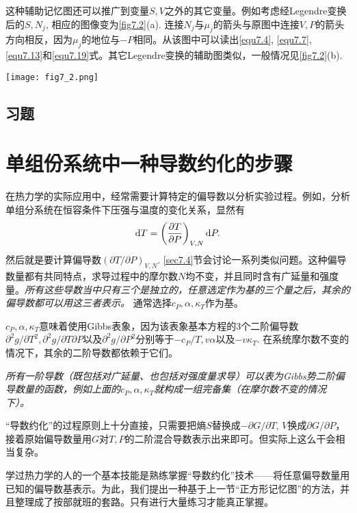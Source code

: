 这种辅助记忆图还可以推广到变量$S, V$之外的其它变量。例如考虑经Legendre变换后的$S, N_j$, 相应的图像变为\ref{fig7.2}(a). 连接$N_j$与$\mu_j$的箭头与原图中连接$V, P$的箭头方向相反，因为$\mu_j$的地位与$-P$相同。从该图中可以读出\eqref{equ7.4}, \eqref{equ7.7}, \eqref{equ7.13}和\eqref{equ7.19}式。其它Legendre变换的辅助图类似，一般情况见\ref{fig7.2}(b).

{
	\centering
	\texttt{[image: fig7\_2.png]}
	\figcaption{}
	\label{fig7.2}
}

\subsection*{习题}


\section{单组份系统中一种导数约化的步骤}
\label{sec7.3}
在热力学的实际应用中，经常需要计算特定的偏导数以分析实验过程。例如，分析单组分系统在恒容条件下压强与温度的变化关系，显然有
\begin{equation}
	\mathrm{d} T = \left( \frac{\partial T}{\partial P} \right)_{V, N} \mathrm{d} P.
\label{equ7.32}
\end{equation}
然后就是要计算偏导数$(\partial T / \partial P)_{V, N}$. \ref{sec7.4}节会讨论一系列类似问题。这种偏导数量都有共同特点，求导过程中的摩尔数$N$均不变，并且同时含有广延量和强度量。{\it 所有这些导数当中只有三个是独立的，任意选定作为基的三个量之后，其余的偏导数都可以用这三者表示。} 通常选择$c_P, \alpha, \kappa_T$作为基。

$c_P, \alpha, \kappa_T$意味着使用Gibbs表象，因为该表象基本方程的3个二阶偏导数$\partial^2 g / \partial T^2, \partial^2 g / \partial T \partial P$以及$\partial^2 g / \partial P^2$分别等于$-c_P / T, v\alpha$以及$-v \kappa_T$. 在系统摩尔数不变的情况下，其余的二阶导数都依赖于它们。

{\it 所有一阶导数（既包括对广延量、也包括对强度量求导）可以表为Gibbs势二阶偏导数量的函数，例如上面的$c_P, \alpha, \kappa_T$就构成一组完备集（在摩尔数不变的情况下）。}

“导数约化”的过程原则上十分直接，只需要把熵$S$替换成$-\partial G / \partial T$, $V$换成$\partial G / \partial P$，接着原始偏导数量用$G$对$T, P$的二阶混合导数表示出来即可。但实际上这么干会相当复杂。

学过热力学的人的一个基本技能是熟练掌握“导数约化”技术——将任意偏导数量用已知的偏导数基表示。为此，我们提出一种基于上一节“正方形记忆图”的方法，并且整理成了按部就班的套路。只有进行大量练习才能真正掌握。

